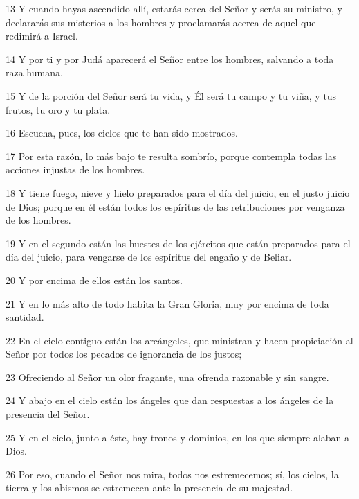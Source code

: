 \par 13 Y cuando hayas ascendido allí, estarás cerca del Señor y serás su ministro, y declararás sus misterios a los hombres y proclamarás acerca de aquel que redimirá a Israel.

\par 14 Y por ti y por Judá aparecerá el Señor entre los hombres, salvando a toda raza humana.

\par 15 Y de la porción del Señor será tu vida, y Él será tu campo y tu viña, y tus frutos, tu oro y tu plata.

\par 16 Escucha, pues, los cielos que te han sido mostrados.

\par 17 Por esta razón, lo más bajo te resulta sombrío, porque contempla todas las acciones injustas de los hombres.

\par 18 Y tiene fuego, nieve y hielo preparados para el día del juicio, en el justo juicio de Dios; porque en él están todos los espíritus de las retribuciones por venganza de los hombres.

\par 19 Y en el segundo están las huestes de los ejércitos que están preparados para el día del juicio, para vengarse de los espíritus del engaño y de Beliar.

\par 20 Y por encima de ellos están los santos.

\par 21 Y en lo más alto de todo habita la Gran Gloria, muy por encima de toda santidad.

\par 22 En el cielo contiguo están los arcángeles, que ministran y hacen propiciación al Señor por todos los pecados de ignorancia de los justos;

\par 23 Ofreciendo al Señor un olor fragante, una ofrenda razonable y sin sangre.

\par 24 Y abajo en el cielo están los ángeles que dan respuestas a los ángeles de la presencia del Señor.

\par 25 Y en el cielo, junto a éste, hay tronos y dominios, en los que siempre alaban a Dios.

\par 26 Por eso, cuando el Señor nos mira, todos nos estremecemos; sí, los cielos, la tierra y los abismos se estremecen ante la presencia de su majestad.


